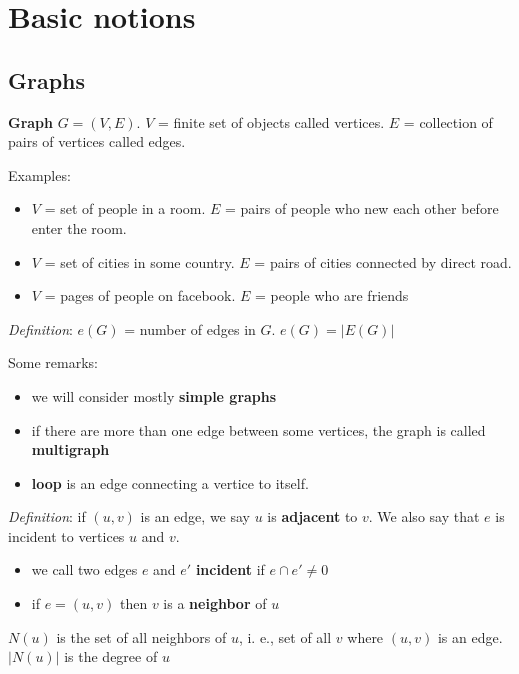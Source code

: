 \documentclass[main]{subfiles}
\begin{document}
\setcounter{section}{1}
\section{Basic notions}


\subsection{Graphs}
\textbf{Graph} $G = (V,E)$. $V$ = finite set of objects called vertices. $E$ = collection of pairs of vertices called edges.

Examples:
\begin{itemize}
\item $V$ = set of people in a room. $E$ = pairs of people who new each other before enter the room.
\item $V$ = set of cities in some country. $E$ = pairs of cities connected by direct road.
\item $V$ = pages of people on facebook. $E$ = people who are friends
\end{itemize}

\textit{Definition}: $e(G)$ = number of edges in $G$. $e(G) = |E(G)|$

Some remarks:
\begin{itemize}
\item we will consider mostly \textbf{simple graphs}
\item if there are more than one edge between some vertices, the graph is called \textbf{multigraph}
\item \textbf{loop} is an edge connecting a vertice to itself.
\end{itemize}

\textit{Definition}: if $(u,v)$ is an edge, we say $u$ is \textbf{adjacent} to $v$. We also say that $e$ is incident to vertices $u$ and $v$.
\begin{itemize}
\item we call two edges $e$ and $e'$ \textbf{incident} if $e \cap e' \neq 0$
\item if $e=(u,v)$ then $v$ is a \textbf{neighbor} of $u$
\end{itemize}

$N(u)$ is the set of all neighbors of $u$, i. e., set of all $v$ where $(u,v)$ is an edge.
$|N(u)|$ is the degree of $u$
\end{document}
